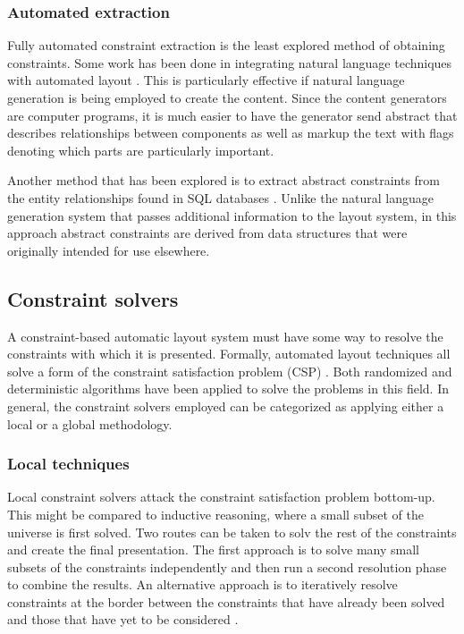     \subsubsection{Automated extraction}

    Fully automated constraint extraction is the least explored method of obtaining constraints. Some work has been done in integrating natural language techniques with automated layout \citep{roth-2}. This is particularly effective if natural language generation is being employed to create the content. Since the content generators are computer programs, it is much easier to have the generator send abstract that describes relationships between components as well as markup the text with flags denoting which parts are particularly important.

    Another method that has been explored is to extract abstract constraints from the entity relationships found in SQL databases \citep{pizano-1}. Unlike the natural language generation system that passes additional information to the layout system, in this approach abstract constraints are derived from data structures that were originally intended for use elsewhere.

    \subsection{Constraint solvers}

    A constraint-based automatic layout system must have some way to resolve the constraints with which it is presented. Formally, automated layout techniques all solve a form of the constraint satisfaction problem (CSP) \citep{mackworth-2,mackworth-1}. Both randomized and deterministic algorithms have been applied to solve the problems in this field. In general, the constraint solvers employed can be categorized as applying either a local or a global methodology.

    \subsubsection{Local techniques}

    Local constraint solvers attack the constraint satisfaction problem bottom-up. This might be compared to inductive reasoning, where a small subset of the universe is first solved. Two routes can be taken to solv the rest of the constraints and create the final presentation. The first approach is to solve many small subsets of the constraints independently and then run a second resolution phase to combine the results. An alternative approach is to iteratively resolve constraints at the border between the constraints that have already been solved and those that have yet to be considered \citep{nilsson-1}.

